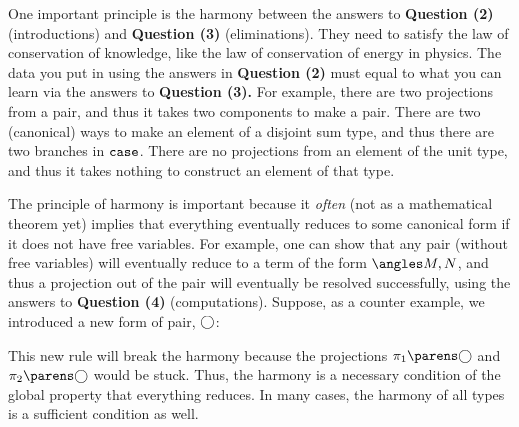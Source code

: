 \documentclass[11pt]{article}
\begin{document}
One important principle is the harmony between the answers to \textbf{Question (2)} (introductions) and \textbf{Question (3)} (eliminations). They need to satisfy the law of conservation of knowledge, like the law of conservation of energy in physics. The data you put in using the answers in \textbf{Question (2)} must equal to what you can learn via the answers to \textbf{Question (3).} For example, there are two projections from a pair, and thus it takes two components to make a pair. There are two (canonical) ways to make an element of a disjoint sum type, and thus there are two branches in $\sumcase$. There are no projections from an element of the unit type, and thus it takes nothing to construct an element of that type.

\NewDocumentCommand{\alianpair}{}{\bigcirc}

The principle of harmony is important because it \emph{often} (not as a mathematical theorem yet) implies that everything eventually reduces to some canonical form if it does not have free variables. For example, one can show that any pair (without free variables) will eventually reduce to a term of the form $\pair{M}{N}$, and thus a projection out of the pair will eventually be resolved successfully, using the answers to \textbf{Question (4)} (computations). Suppose, as a counter example, we introduced a new form of pair, $\alianpair$:
\begin{prooftree*}
\end{prooftree*}
This new rule will break the harmony because the projections $\pairfst{\alianpair}$ and $\pairsnd{\alianpair}$ would be stuck. Thus, the harmony is a necessary condition of the global property that everything reduces. In many cases, the harmony of all types is a sufficient condition as well.

\printbibliography
\end{document}
